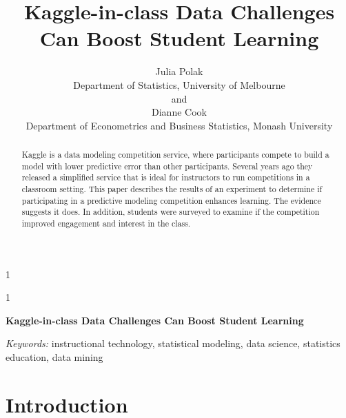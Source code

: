 \documentclass[12pt]{article}
\newcommand{\blind}{1}
\begin{document}
\def\spacingset#1{\renewcommand{\baselinestretch}%
{#1}\small\normalsize} \spacingset{1}



\blind
{
  \title{\bf Kaggle-in-class Data Challenges Can Boost Student Learning}

  \author{
        Julia Polak \\
    Department of Statistics, University of Melbourne\\
     and \\     Dianne Cook \\
    Department of Econometrics and Business Statistics, Monash University\\
      }
  \maketitle
} \fi

\blind
{
  \bigskip
  \bigskip
  \bigskip
  \begin{center}
    {\LARGE\bf Kaggle-in-class Data Challenges Can Boost Student Learning}
  \end{center}
  \medskip
} \fi

\bigskip
\begin{abstract}
Kaggle is a data modeling competition service, where participants
compete to build a model with lower predictive error than other
participants. Several years ago they released a simplified service that
is ideal for instructors to run competitions in a classroom setting.
This paper describes the results of an experiment to determine if
participating in a predictive modeling competition enhances learning.
The evidence suggests it does. In addition, students were surveyed to
examine if the competition improved engagement and interest in the
class.
\end{abstract}

\noindent%
{\it Keywords:} instructional technology, statistical modeling, data science, statistics education, data mining
\vfill

\newpage
\spacingset{1.45} %

\providecommand{\tightlist}{%
    \setlength{\itemsep}{0pt}\setlength{\parskip}{0pt}}







\section{Introduction}\label{introduction}
\end{document}
